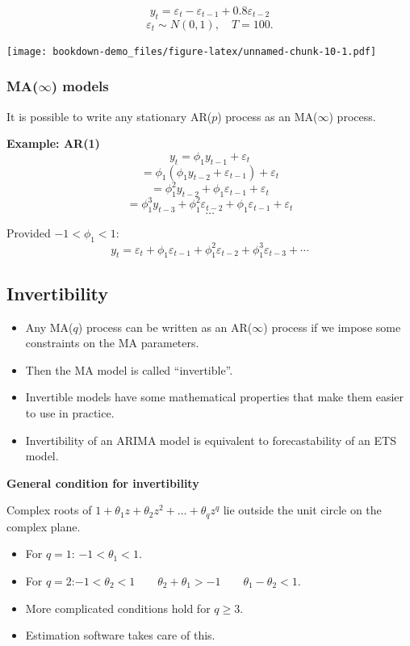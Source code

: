 \documentclass[]{book}
\providecommand{\tightlist}{%
  \setlength{\itemsep}{0pt}\setlength{\parskip}{0pt}}
\begin{document}
\[y_t = \varepsilon_t -\varepsilon_{t-1} + 0.8 \varepsilon_{t-2}\]
\[\varepsilon_t\sim N(0,1),\quad T=100.\]

\texttt{[image: bookdown-demo\_files/figure-latex/unnamed-chunk-10-1.pdf]}

\hypertarget{mainfty-models}{%
\subsubsection{\texorpdfstring{MA(\(\infty\)) models}{MA(\textbackslash{}infty) models}}\label{mainfty-models}}

It is possible to write any stationary AR(\(p\)) process as an MA(\(\infty\)) process.

\textbf{Example: AR(1)}
\[y_t = \phi_1y_{t-1} + \varepsilon_t\]
\[= \phi_1(\phi_1y_{t-2} + \varepsilon_{t-1}) + \varepsilon_t\]
\[= \phi_1^2y_{t-2} + \phi_1 \varepsilon_{t-1} + \varepsilon_t\]
\[= \phi_1^3y_{t-3} + \phi_1^2\varepsilon_{t-2} + \phi_1 \varepsilon_{t-1} + \varepsilon_t\]
\[\dots\]

Provided \(-1 < \phi_1 < 1\):
\[y_t = \varepsilon_t + \phi_1 \varepsilon_{t-1} + \phi_1^2 \varepsilon_{t-2} + \phi_1^3 \varepsilon_{t-3} + \cdots\]

\hypertarget{invertibility}{%
\subsection{Invertibility}\label{invertibility}}

\begin{itemize}
\tightlist
\item
  Any MA(\(q\)) process can be written as an AR(\(\infty\)) process if we impose some constraints on the MA parameters.
\item
  Then the MA model is called ``invertible''.
\item
  Invertible models have some mathematical properties that make them easier to use in practice.
\item
  Invertibility of an ARIMA model is equivalent to forecastability of an ETS model.
\end{itemize}

\textbf{General condition for invertibility}

Complex roots of \(1+\theta_1 z + \theta_2 z^2 + \dots + \theta_qz^q\) lie outside the unit circle on the complex plane.

\begin{itemize}
\tightlist
\item
  For \(q=1\): \(-1<\theta_1<1\).
\item
  For \(q=2\):\newline \(-1<\theta_2<1\qquad \theta_2+\theta_1 >-1 \qquad \theta_1 -\theta_2 < 1\).
\item
  More complicated conditions hold for \(q\ge3\).
\item
  Estimation software takes care of this.
\end{itemize}
\end{document}
